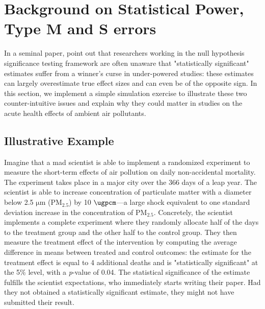 \documentclass[12pt]{article}
\begin{document}



\section{Background on Statistical Power, Type M and S errors}

    In a seminal paper, \cite{gelman_beyond_2014} point out that researchers working in the null hypothesis significance testing framework are often unaware that "statistically significant" estimates suffer from a winner's curse in under-powered studies: these estimates can largely overestimate true effect sizes and can even be of the opposite sign. In this section, we implement a simple simulation exercise to illustrate these two counter-intuitive issues and explain why they could matter in studies on the acute health effects of ambient air pollutants.

    \subsection{Illustrative Example}

    Imagine that a mad scientist is able to implement a randomized experiment to measure the short-term effects of air pollution on daily non-accidental mortality. The experiment takes place in a major city over the 366 days of a leap year. The scientist is able to increase concentration of particulate matter with a diameter below 2.5 $\si{\um}$ (PM$_{2.5}$) by 10 $\si{\ugpcm}$---a large shock equivalent to one standard deviation increase in the concentration of PM$_{2.5}$. Concretely, the scientist implements a complete experiment where they randomly allocate half of the days to the treatment group and the other half to the control group. They then measure the treatment effect of the intervention by computing the average difference in means between treated and control outcomes: the estimate for the treatment effect is equal to 4 additional deaths and is "statistically significant" at the 5\% level, with a \textit{p}-value of 0.04. The statistical significance of the estimate fulfills the scientist expectations, who immediately starts writing their paper. Had they not obtained a statistically significant estimate, they might not have submitted their result. 
    
\end{document}
